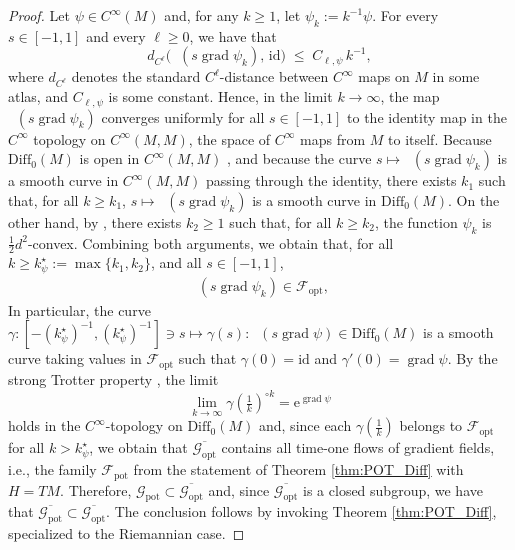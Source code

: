 \documentclass{article}
\theoremstyle{remark}
\newcommand{\M}{M}
\newcommand{\Cinf}{C^{\infty}(\M)}
\newcommand{\cconv}{$\tfrac{1}{2}d^2$-convex}
\newcommand{\Diff}{\mathrm{Diff}_0(\M)}
\DeclareMathOperator{\grad}{\mathrm{grad}}
\DeclareMathOperator{\expg}{\mathrm{exp}^{\text{$g$}}}
\newcommand{\GOPT}{\mathcal{G}_{\mathrm{opt}}}
\newcommand{\FOPT}{\mathcal{F}_{\mathrm{opt}}}
\newcommand{\GPOT}{\mathcal{G}_{\mathrm{pot}}}
\newcommand{\FPOT}{\mathcal{F}_{\mathrm{pot}}}
\begin{document}
\begin{proof} 
    Let $\psi\in\Cinf$ and, for any $k\geq 1$, let $\psi_k:=k^{-1}\psi$.
    For every $s\in[-1,1]$ and every $\ell\geq 0$, we have that
    $$d_{C^{\ell}}\bigl( \expg(s \grad \psi_{k}),\, \mathrm{id} \bigr)
\;\leq\; C_{\ell,\psi}\, k^{-1},$$
    where $d_{C^{\ell}}$ denotes the standard $C^{\ell}$-distance between $C^\infty$ maps on $\M$ in some atlas, and $C_{\ell,\psi}$ is some constant. Hence, in the limit $k\rightarrow\infty$, the map $\expg(s \grad \psi_k)$ converges uniformly for all $s\in[-1,1]$ to the identity map in the $C^\infty$ topology on $C^\infty(\M,\M)$, the space of $C^\infty$ maps from $\M$ to itself. Because $\Diff$ is open in $C^\infty(\M,\M)$ \cite{KrieglMichor1997}, and because the curve $s\mapsto \expg(s \grad \psi_k)$ is a smooth curve in $C^\infty(\M,\M)$ passing through the identity, there exists $k_1$ such that, for all $k\geq k_1$, $s\mapsto \expg(s \grad \psi_k)$ is a smooth curve in $\Diff$. On the other hand, by \cite[Theorem 13.5]{Villani2009}, there exists $k_2\geq 1$ such that, for all $k\geq k_2$, the function $\psi_k$ is \cconv{}. Combining both arguments, we obtain that, for all $k\geq k^\star_\psi:=\max\{k_1,k_2\}$, and all $s\in[-1,1]$,
    \begin{align}
        \expg(s\grad \psi_k) \in \FOPT,
    \end{align}
    In particular, the curve $\gamma: [-(k^\star_\psi)^{-1},(k^\star_\psi)^{-1}]\ni s\mapsto \gamma(s):\expg(s \grad \psi)\in\Diff$ is a smooth curve taking values in $\FOPT$ such that $\gamma(0)=\mathrm{id}$ and $\gamma'(0) = \grad \psi$. By the strong Trotter property \cite[pp. 7-8]{Glockner2015}, the limit
    $$
    \lim_{k\rightarrow \infty} \gamma\left(\tfrac{1}{k}\right)^{\circ k}  = \mathrm{e}^{\grad \psi}
    $$ 
    holds in the $C^\infty$-topology on $\Diff$ and, since each $\gamma\left(\tfrac{1}{k}\right)$ belongs to $\FOPT$ for all $k>k^\star_\psi$, we obtain that $\overline{\GOPT}$ contains all time-one flows of gradient fields, i.e., the family $\FPOT$ from the statement of Theorem \ref{thm:POT_Diff} with $H=T\M$. Therefore, $\GPOT\subset \overline{\GOPT}$ and, since $\overline{\GOPT}$ is a closed subgroup, we have that $\overline{\GPOT}\subset \overline{\GOPT}$. The conclusion follows by invoking Theorem \ref{thm:POT_Diff}, specialized to the Riemannian case.
\end{proof}
%

%
\end{document}
